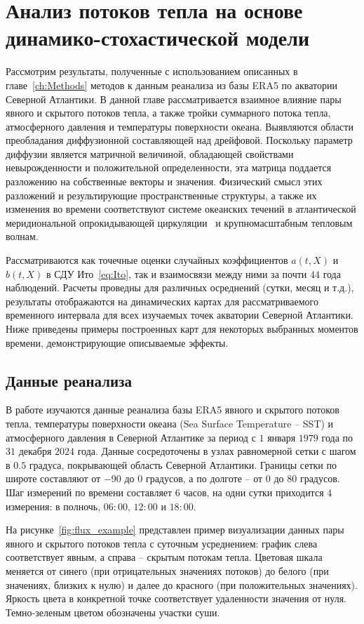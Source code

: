 \chapter{Анализ потоков тепла на основе динамико-стохастической модели}
\label{chc:Analysis}
Рассмотрим результаты, полученные с использованием описанных в главе~\ref{ch:Methods} методов к данным реанализа из базы ERA5 по акватории Северной Атлантики. 
В данной главе рассматривается взаимное влияние пары явного и скрытого потоков тепла, а также тройки суммарного потока тепла, атмосферного давления и температуры поверхности океана. Выявляются области преобладания диффузионной составляющей над дрейфовой. Поскольку параметр диффузии является матричной величиной, обладающей свойствами невырожденности и положительной определенности, эта матрица поддается разложению на собственные векторы и значения. Физический смысл этих разложений и результирующие пространственные структуры, а также их изменения во времени соответствуют системе океанских течений в атлантической меридиональной опрокидывающей циркуляции~\cite{Caesar2018} и крупномасштабным тепловым волнам.

Рассматриваются как точечные оценки случайных коэффициентов $a(t,X)$ и $b(t, X)$ в СДУ Ито~\eqref{eq:Ito}, так и взаимосвязи между ними за почти $44$ года наблюдений. Расчеты проведны для различных осреднений (сутки, месяц и т.д.), результаты отображаются на динамических картах для рассматриваемого временного интервала для всех изучаемых точек акватории Северной Атлантики. Ниже приведены примеры построенных карт для некоторых выбранных моментов времени, демонстрирующие описываемые эффекты.


\section{Данные реанализа}
В работе изучаются данные реанализа базы ERA5 явного и скрытого потоков тепла, температуры поверхности океана (Sea Surface Temperature -- SST) и атмосферного давления в Северной Атлантике за период с $1$ января $1979$ года по $31$ декабря $2024$ года. Данные сосредоточены в узлах равномерной сетки с шагом в $0.5$ градуса, покрывающей область Северной Атлантики. Границы сетки по широте составляют от $-90$ до $0$ градусов, а по долготе -- от $0$ до $80$ градусов. Шаг измерений по времени составляет $6$ часов, на одни сутки приходится $4$ измерения: в полночь, $06:00$, $12:00$ и $18:00$.

На рисунке~\ref{fig:flux_example} представлен пример визуализации данных пары явного и скрытого потоков тепла с суточным усреднением: график слева соответствует явным, а справа -- скрытым потокам тепла. Цветовая шкала меняется от синего (при отрицательных значениях потоков) до белого (при значениях, близких к нулю) и далее до красного (при положительных значениях). Яркость цвета в конкретной точке соответствует удаленности значения от нуля. Темно-зеленым цветом обозначены участки суши.

